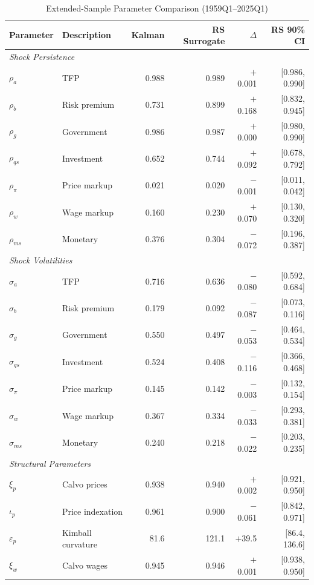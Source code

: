 \documentclass[12pt]{article}
\theoremstyle{plain}
\theoremstyle{definition}
\theoremstyle{remark}
\begin{document}
\begin{table}[htbp]
\centering
\caption{Extended-Sample Parameter Comparison (1959Q1--2025Q1)}
\label{tab:extended_sample_posterior}
\begin{tabular}{llrrrr}
\toprule
Parameter & Description & Kalman & RS Surrogate & $\Delta$ & RS 90\% CI \\
\midrule
\multicolumn{6}{l}{\textit{Shock Persistence}} \\
$\rho_a$ & TFP & 0.988 & 0.989 & $+$0.001 & [0.986, 0.990] \\
$\rho_b$ & Risk premium & 0.731 & 0.899 & $+$0.168 & [0.832, 0.945] \\
$\rho_g$ & Government & 0.986 & 0.987 & $+$0.000 & [0.980, 0.990] \\
$\rho_{qs}$ & Investment & 0.652 & 0.744 & $+$0.092 & [0.678, 0.792] \\
$\rho_{\pi}$ & Price markup & 0.021 & 0.020 & $-$0.001 & [0.011, 0.042] \\
$\rho_w$ & Wage markup & 0.160 & 0.230 & $+$0.070 & [0.130, 0.320] \\
$\rho_{ms}$ & Monetary & 0.376 & 0.304 & $-$0.072 & [0.196, 0.387] \\
\midrule
\multicolumn{6}{l}{\textit{Shock Volatilities}} \\
$\sigma_a$ & TFP & 0.716 & 0.636 & $-$0.080 & [0.592, 0.684] \\
$\sigma_b$ & Risk premium & 0.179 & 0.092 & $-$0.087 & [0.073, 0.116] \\
$\sigma_g$ & Government & 0.550 & 0.497 & $-$0.053 & [0.464, 0.534] \\
$\sigma_{qs}$ & Investment & 0.524 & 0.408 & $-$0.116 & [0.366, 0.468] \\
$\sigma_{\pi}$ & Price markup & 0.145 & 0.142 & $-$0.003 & [0.132, 0.154] \\
$\sigma_w$ & Wage markup & 0.367 & 0.334 & $-$0.033 & [0.293, 0.381] \\
$\sigma_{ms}$ & Monetary & 0.240 & 0.218 & $-$0.022 & [0.203, 0.235] \\
\midrule
\multicolumn{6}{l}{\textit{Structural Parameters}} \\
$\xi_p$ & Calvo prices & 0.938 & 0.940 & $+$0.002 & [0.921, 0.950] \\
$\iota_p$ & Price indexation & 0.961 & 0.900 & $-$0.061 & [0.842, 0.971] \\
$\varepsilon_p$ & Kimball curvature & 81.6 & 121.1 & $+$39.5 & [86.4, 136.6] \\
$\xi_w$ & Calvo wages & 0.945 & 0.946 & $+$0.001 & [0.938, 0.950] \\

\end{tabular}
\end{table}
\end{document}

